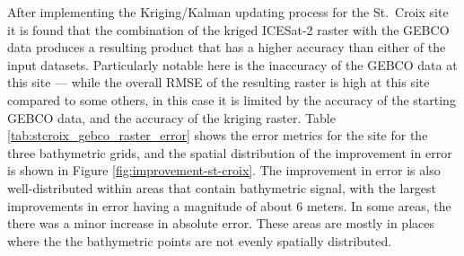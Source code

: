 After implementing the Kriging/Kalman updating process for the St.~Croix site it is found that the combination of the kriged ICESat-2 raster with the GEBCO data produces a resulting product that has a higher accuracy than either of the input datasets. Particularly notable here is the inaccuracy of the GEBCO data at this site --- while the overall RMSE of the resulting raster is high at this site compared to some others, in this case it is limited by the accuracy of the starting GEBCO data, and the accuracy of the kriging raster. Table \ref{tab:stcroix_gebco_raster_error} shows the error metrics for the site for the three bathymetric grids, and the spatial distribution of the improvement in error is shown in Figure \ref{fig:improvement-st-croix}. The improvement in error is also well-distributed within areas that contain bathymetric signal, with the largest improvements in error having a magnitude of about 6 meters. In some areas, the there was a minor increase in absolute error. These areas are mostly in places where the the bathymetric points are not evenly spatially distributed.


\begin{figure}[htbp]

    \begin{floatrow}



    \end{floatrow}
\end{figure}



